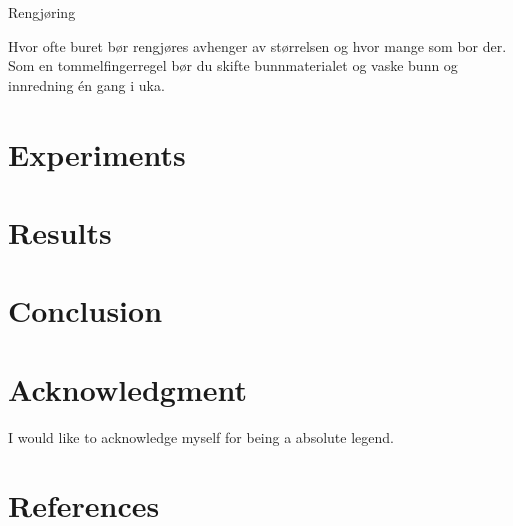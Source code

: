 \documentclass[conference]{IEEEtran}
\begin{document}
Rengjøring

Hvor ofte buret bør rengjøres avhenger av størrelsen og hvor mange som bor der. Som en tommelfingerregel bør du skifte bunnmaterialet og vaske bunn og innredning én gang i uka. 

\section{Experiments}

\section{Results}

\section{Conclusion}


\section*{Acknowledgment}

I would like to acknowledge myself for being a absolute legend.

\section*{References}




\end{document}
